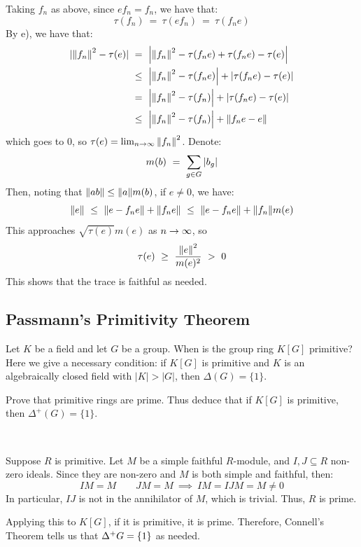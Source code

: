 \begin{pf}
	Taking $f_{n}$ as above, since $ef_{n}=f_{n}$, we have that:
	\begin{equation*}
		\tau(f_{n}) \ = \ \tau(ef_{n}) \ = \ \tau(f_{n}e)
	\end{equation*}
	By e), we have that:
	\begin{align*}
		|\norm{f_{n}}^{2}-\tau(e)|
		& \ = \ \abs{\norm{f_{n}}^{2}-\tau(f_{n}e)+\tau(f_{n}e)-\tau(e)} \\
		& \ \leq \ \abs{\norm{f_{n}}^{2}-\tau(f_{n}e)}+\abs{\tau(f_{n}e)-\tau(e)} \\
		& \ = \ \abs{\norm{f_{n}}^{2}-\tau(f_{n})}+\abs{\tau(f_{n}e)-\tau(e)} \\
		& \ \leq \ \abs{\norm{f_{n}}^{2}-\tau(f_{n})}+\norm{f_{n}e-e}
	\end{align*}
	which goes to 0, so $\tau(e)=\lim_{n\rightarrow\infty}\norm{f_{n}}^{2}$.
	Denote:
	\begin{equation*}
		m(b) \ = \ \sum_{g\in G}\abs{b_{g}}
	\end{equation*}
	Then, noting that $\norm{ab}\leq\norm{a}m(b)$, if $e\neq 0$, we have:
	\begin{equation*}
		\norm{e}
		\ \leq \ \norm{e-f_{n}e}+\norm{f_{n}e}
		\ \leq \ \norm{e-f_{n}e}+\norm{f_{n}}m(e)
	\end{equation*}
	This approaches $\sqrt{\tau(e)}m(e)$ as $n\rightarrow\infty$, so
	\begin{equation*}
		\tau(e) \ \geq \ \frac{\norm{e}^{2}}{m(e)^{2}} \ > \ 0
	\end{equation*}
	This shows that the trace is faithful as needed.
\end{pf}


\newpage
\subsection{Passmann's Primitivity Theorem}
Let $K$ be a field and let $G$ be a group.
When is the group ring $K[G]$ primitive? Here we give a necessary condition:
if $K[G]$ is primitive and $K$ is an algebraically closed field with $|K|>|G|$, then $\Delta(G)=\{1\}$.

\begin{exr}
	Prove that primitive rings are prime.
	Thus deduce that if $K[G]$ is primitive, then $\Delta^+(G)=\{1\}$.
\end{exr} \

\begin{pf}
	Suppose $R$ is primitive.
	Let $M$ be a simple faithful $R$-module, and
	$I,J\subseteq R$ non-zero ideals.
	Since they are non-zero and $M$ is both simple and faithful, then:
	\begin{equation*}
		IM = M \qquad JM = M \ \implies \ IM=IJM=M\neq0
	\end{equation*}
	In particular, $IJ$ is not in the annihilator of $M$, which is trivial.
	Thus, $R$ is prime.

	Applying this to $K[G]$, if it is primitive, it is prime.
	Therefore, Connell's Theorem tells us that $\Delta^{+}G=\left\{{1}\right\}$ as needed.
\end{pf} \

